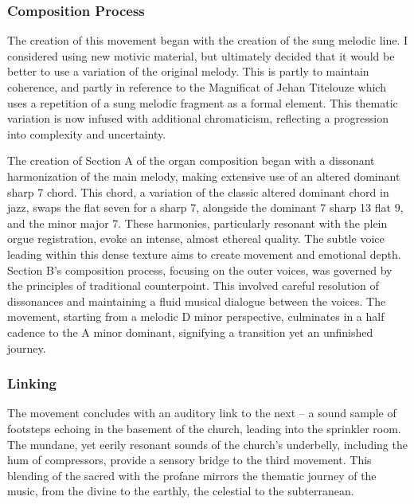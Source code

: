 \documentclass[12pt,twoside,maitrise]{dms}
\theoremstyle{definition}
\begin{document}
\subsubsection{Composition Process}

The creation of this movement began with the creation of the sung melodic line.
I considered using new motivic material, but ultimately decided that it would be better to use a variation of the original melody.
This is partly to maintain coherence, and partly in reference to the Magnificat of Jehan Titelouze which uses a repetition of a sung melodic fragment as a formal element.
This thematic variation is now infused with additional chromaticism, reflecting a progression into complexity and uncertainty.


The creation of Section A of the organ composition began with a dissonant harmonization of the main melody, making extensive use of an altered dominant sharp 7 chord.
This chord, a variation of the classic altered dominant chord in jazz, swaps the flat seven for a sharp 7, alongside the dominant 7 sharp 13 flat 9, and the minor major 7.
These harmonies, particularly resonant with the plein orgue registration, evoke an intense, almost ethereal quality.
The subtle voice leading within this dense texture aims to create movement and emotional depth.
Section B's composition process, focusing on the outer voices, was governed by the principles of traditional counterpoint.
This involved careful resolution of dissonances and maintaining a fluid musical dialogue between the voices.
The movement, starting from a melodic D minor perspective, culminates in a half cadence to the A minor dominant, signifying a transition yet an unfinished journey.


\subsubsection{Linking}

The movement concludes with an auditory link to the next – a sound sample of footsteps echoing in the basement of the church, leading into the sprinkler room.
The mundane, yet eerily resonant sounds of the church's underbelly, including the hum of compressors, provide a sensory bridge to the third movement.
This blending of the sacred with the profane mirrors the thematic journey of the music, from the divine to the earthly, the celestial to the subterranean.
\end{document}
